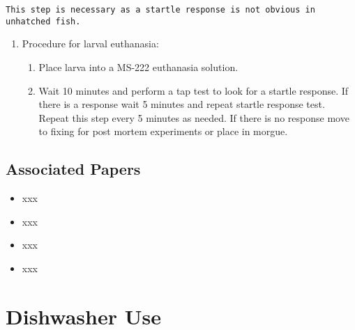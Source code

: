 \documentclass[
  letterpaper,
  DIV=11,
  numbers=noendperiod]{scrreprt}
\providecommand{\tightlist}{%
  \setlength{\itemsep}{0pt}\setlength{\parskip}{0pt}}\usepackage{longtable,booktabs,array}
\begin{document}
\begin{tcolorbox}[enhanced jigsaw, toprule=.15mm, breakable, coltitle=black, leftrule=.75mm, title=\textcolor{quarto-callout-warning-color}{\faExclamationTriangle}\hspace{0.5em}{NOTES}, bottomrule=.15mm, toptitle=1mm, bottomtitle=1mm, colframe=quarto-callout-warning-color-frame, opacityback=0, colback=white, opacitybacktitle=0.6, colbacktitle=quarto-callout-warning-color!10!white, rightrule=.15mm, titlerule=0mm, arc=.35mm, left=2mm]

\begin{verbatim}
This step is necessary as a startle response is not obvious in unhatched fish.
\end{verbatim}

\end{tcolorbox}

\begin{enumerate}
\def\labelenumi{\arabic{enumi}.}
\setcounter{enumi}{1}
\item
  Procedure for larval euthanasia:

  \begin{enumerate}
  \def\labelenumii{\arabic{enumii}.}
  \tightlist
  \item
    Place larva into a MS-222 euthanasia solution.
  \item
    Wait 10 minutes and perform a tap test to look for a startle
    response. If there is a response wait 5 minutes and repeat startle
    response test. Repeat this step every 5 minutes as needed. If there
    is no response move to fixing for post mortem experiments or place
    in morgue.
  \end{enumerate}
\end{enumerate}

\hypertarget{associated-papers-26}{%
\section{Associated Papers}\label{associated-papers-26}}

\begin{itemize}
\tightlist
\item
  xxx
\item
  xxx
\item
  xxx
\item
  xxx
\end{itemize}

\hypertarget{sec-husbandry-dishwasher}{%
\chapter{Dishwasher Use}\label{sec-husbandry-dishwasher}}
\end{document}
